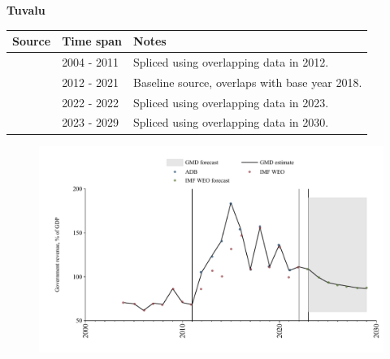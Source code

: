 \documentclass[12pt,a4paper,landscape]{article}
\begin{document}
\begin{adjustbox}{max totalsize={\paperwidth}{\paperheight},center}
\begin{minipage}[t][\textheight][t]{\textwidth}
\vspace*{0.5cm}
{}
\begin{center}
{\Large\bfseries Tuvalu}
\end{center}
\vspace{0.5cm}
\begin{table}[H]
\centering
\small
\begin{tabular}{|l|l|l|}
\hline
\textbf{Source} & \textbf{Time span} & \textbf{Notes} \\
\hline
\rowcolor{white}\cite{IMF_WEO}& 2004 - 2011 &Spliced using overlapping data in 2012.\\
\rowcolor{lightgray}\cite{ADB}& 2012 - 2021 &Baseline source, overlaps with base year 2018.\\
\rowcolor{white}\cite{IMF_WEO}& 2022 - 2022 &Spliced using overlapping data in 2023.\\
\rowcolor{lightgray}\cite{IMF_WEO_forecast}& 2023 - 2029 &Spliced using overlapping data in 2030.\\
\hline
\end{tabular}
\end{table}
\begin{figure}[H]
\centering
\includegraphics[width=\textwidth,height=0.6\textheight,keepaspectratio]{graphs/TUV_govrev_GDP.pdf}
\end{figure}
\end{minipage}
\end{adjustbox}
\end{document}
